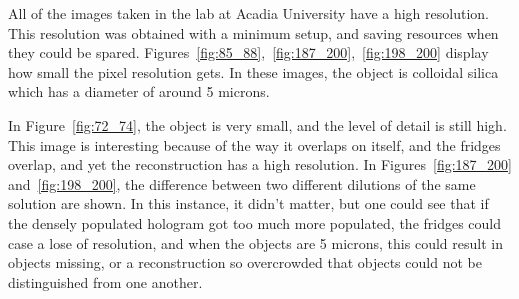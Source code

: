 \clearpage

All of the images taken in the lab at Acadia University have a high resolution.
This resolution was obtained with a minimum setup, and saving resources when
they could be spared.
Figures~\ref{fig:85_88},~\ref{fig:187_200},~\ref{fig:198_200} display how small
the pixel resolution gets. In these images, the object is colloidal silica
which has a diameter of around 5 microns.

In Figure~\ref{fig:72_74}, the object is very small, and the level of detail is
still high. This image is interesting because of the way it overlaps on itself,
and the fridges overlap, and yet the reconstruction has a high resolution.
In Figures~\ref{fig:187_200} and~\ref{fig:198_200}, the difference between two
different dilutions of the same solution are shown. In this instance, it didn't
matter, but one could see that if the densely populated hologram got too much
more populated, the fridges could case a lose of resolution, and when the
objects are 5 microns, this could result in objects missing, or a
reconstruction so overcrowded that objects could not be distinguished from one
another.








%
